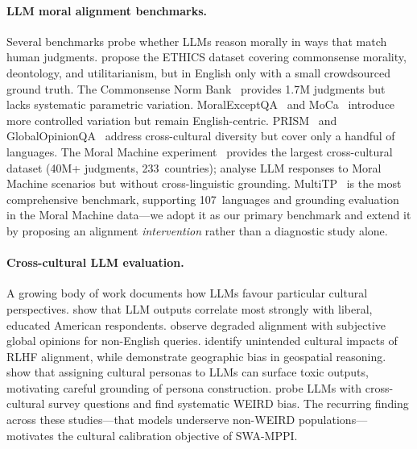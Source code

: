 \documentclass{article}
\begin{document}
\paragraph{LLM moral alignment benchmarks.}
Several benchmarks probe whether LLMs reason morally in ways that match human judgments.
\citet{hendrycks2021aligning} propose the ETHICS dataset covering commonsense morality,
deontology, and utilitarianism, but in English only with a small crowdsourced ground truth.
The Commonsense Norm Bank~\citep{commonsense2021} provides 1.7M judgments but lacks
systematic parametric variation. MoralExceptQA~\citep{jin2022exceptions} and
MoCa~\citep{nie2023moca} introduce more controlled variation but remain English-centric.
PRISM~\citep{kirk2024prism} and GlobalOpinionQA~\citep{durmus2023global} address
cross-cultural diversity but cover only a handful of languages. The Moral Machine
experiment~\citep{awad2018moral} provides the largest cross-cultural dataset (40M+
judgments, 233~countries); \citet{takemoto2024moral} analyse LLM responses to Moral
Machine scenarios but without cross-linguistic grounding. MultiTP~\citep{jin2025multitp}
is the most comprehensive benchmark, supporting 107~languages and grounding evaluation
in the Moral Machine data---we adopt it as our primary benchmark and extend it by
proposing an alignment \emph{intervention} rather than a diagnostic study alone.

\paragraph{Cross-cultural LLM evaluation.}
A growing body of work documents how LLMs favour particular cultural perspectives.
\citet{santurkar2023opinions} show that LLM outputs correlate most strongly with liberal,
educated American respondents. \citet{durmus2023global} observe degraded alignment with
subjective global opinions for non-English queries. \citet{ryan2024unintended} identify
unintended cultural impacts of RLHF alignment, while \citet{manvi2024geographic}
demonstrate geographic bias in geospatial reasoning. \citet{deshpande2023toxicity} show
that assigning cultural personas to LLMs can surface toxic outputs, motivating careful
grounding of persona construction. \citet{arora2023probing} probe LLMs with cross-cultural
survey questions and find systematic WEIRD bias. The recurring finding across these
studies---that models underserve non-WEIRD populations---motivates the cultural
calibration objective of SWA-MPPI.
\end{document}
